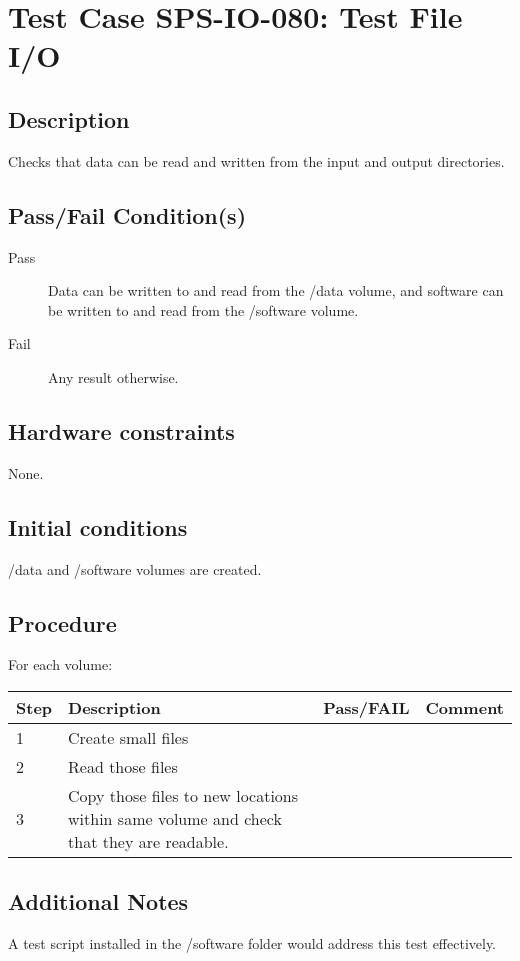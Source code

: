 \section{Test Case SPS-IO-080: Test File I/O}

\subsection{Description}

Checks that data can be read and written from the input and output directories.

\subsection{Pass/Fail Condition(s)}

\begin{description}
\item [Pass] Data can be written to and read from the /data volume, 
and software can be written to and read from the /software volume.
\item [Fail] Any result otherwise. 
\end{description}

\subsection{Hardware constraints}

None.

\subsection{Initial conditions}

/data and /software volumes are created.

\subsection{Procedure}

For each volume:

\begin{table}[H]
    \begin{tabular}{|l| p{5cm} |l| p{5cm} |}
    \hline
    {\bf Step} & {\bf Description} & {\bf Pass/FAIL} & {\bf Comment}  \\ \hline
    1 & Create small files &  &  \\ \hline
    2 & Read those files &  &  \\ \hline
    3 & Copy those files to new locations within same volume and check that they are readable. &  &  \\ \hline
    \end{tabular}
\end{table}


\subsection{Additional Notes}

A test script installed in the /software folder would address this test effectively.
